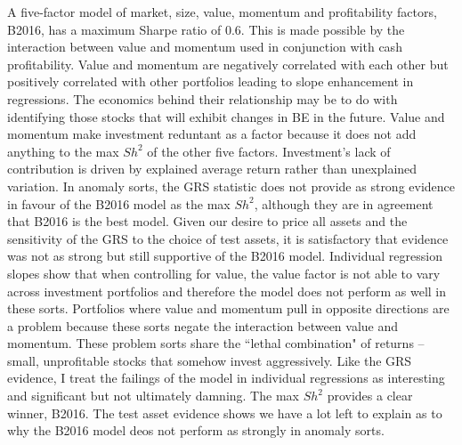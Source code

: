 A five-factor model of market, size, value, momentum and profitability factors, B2016, has
a maximum Sharpe ratio of 0.6. This is made possible by the interaction between value and
momentum used in conjunction with cash profitability. Value and momentum are negatively
correlated with each other but positively correlated with other portfolios leading to
slope enhancement in regressions. The economics behind their relationship may be to do
with identifying those stocks that will exhibit changes in BE in the future. Value and
momentum make investment reduntant as a factor because it does not add anything to the max
$Sh^2$ of the other five factors. Investment's lack of contribution is driven by explained
average return rather than unexplained variation. In anomaly sorts, the GRS statistic does
not provide as strong evidence in favour of the B2016 model as the max $Sh^2$, although
they are in agreement that B2016 is the best model. Given our desire to price all assets
and the sensitivity of the GRS to the choice of test assets, it is satisfactory that
evidence was not as strong but still supportive of the B2016 model. Individual regression
slopes show that when controlling for value, the value factor is not able to vary across
investment portfolios and therefore the model does not perform as well in these sorts.
Portfolios where value and momentum pull in opposite directions are a problem because
these sorts negate the interaction between value and momentum. These problem sorts share
the ``lethal combination" of returns -- small, unprofitable stocks that somehow invest
aggressively. Like the GRS evidence, I treat the failings of the model in individual
regressions as interesting and significant but not ultimately damning. The max $Sh^2$
provides a clear winner, B2016. The test asset evidence shows we have a lot left to
explain as to why the B2016 model deos not perform as strongly in anomaly sorts.
